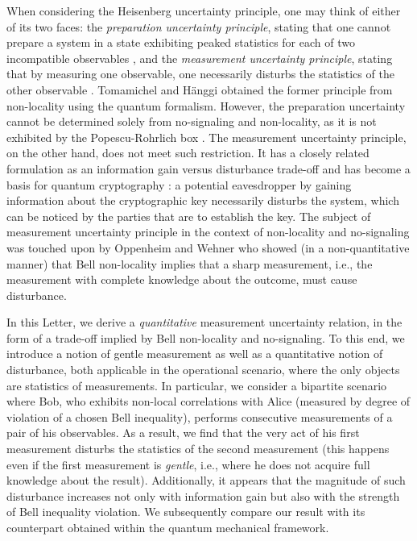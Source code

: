 \documentclass[pra,twocolumn,showpacs,preprintnumbers,amsmath,amssymb,superscriptaddress]{revtex4-1}
\begin{document}
When considering the Heisenberg uncertainty principle, one may think of either of its two faces: the {\it preparation uncertainty principle}, stating that one cannot prepare a system in a state exhibiting peaked statistics for each of two incompatible observables \cite{Robertson1929,WinterWehner2010, Bialynicki2011}, and the {\it measurement uncertainty principle}, stating that by measuring one observable, one necessarily disturbs the statistics of the other observable \cite{Ozawa2003, Ozawa2004PhysLett,Erhart2012,BuschLahtiWerner2013}. Tomamichel and H\"anggi \cite{TomamichelHanggi2013} obtained the former principle from non-locality using the quantum formalism. However, the preparation uncertainty cannot be determined solely from 
no-signaling and non-locality, as it is not exhibited by the Popescu-Rohrlich box \cite{OppenheimWehner2010}. 
The measurement uncertainty principle, on the other hand, does not meet such restriction. It has a closely related formulation as an information gain versus disturbance trade-off \cite{FuchsPerez1996,Dariano2003,Maccone2006,Banaszek2006,BuscemiHayashiHorodecki2008,BuscemiHallOzawaWilde2014} and has become a basis for quantum cryptography \cite{BB84,B92}: a potential eavesdropper by gaining information about the cryptographic key necessarily disturbs the system, which can be noticed by the parties that are to establish the key.
The subject of measurement uncertainty principle in the context of non-locality and no-signaling was touched upon by Oppenheim and Wehner \cite{OppenheimWehner2010} who showed (in a non-quantitative manner) that Bell non-locality implies that a sharp measurement, i.e., the measurement with complete knowledge about the outcome, must cause disturbance.

In this Letter, we derive a {\it quantitative} measurement uncertainty relation, in the form of a trade-off implied by Bell non-locality and no-signaling. To this end, we introduce a notion of gentle measurement as well as a quantitative notion of disturbance, both applicable in 
the operational scenario, where the only objects are statistics of measurements. In particular, we consider a bipartite scenario where Bob, who exhibits non-local correlations with Alice (measured by degree of violation of a chosen Bell inequality), performs consecutive measurements of a pair of his observables. As a result, we find that the very act of his first measurement disturbs the statistics of the second measurement (this happens even if the first measurement is \textit{gentle}, i.e., where he does not acquire full knowledge about the result). Additionally, it appears that the magnitude of such disturbance increases not only with information gain but also with the strength of Bell inequality violation. We subsequently compare our result with its counterpart obtained within the quantum mechanical framework. 
\end{document}
